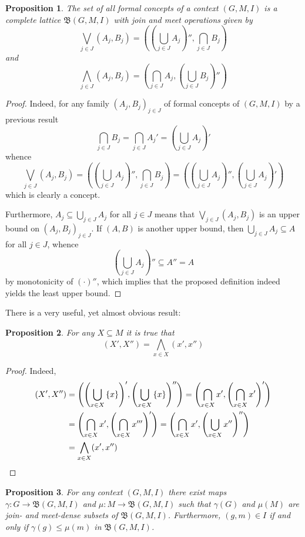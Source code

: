 \documentclass[a4paper]{article}
\newcommand{\obj}[1]{{\left\{ #1 \right \}}}
\newcommand{\brac}[1]{{\left ( #1 \right )}}
\newcommand{\cltc}{\mathfrak{B}}
\newtheorem{prop}{Proposition}
\begin{document}
\begin{prop} The set of all formal concepts of a context $(G,M,I)$ is a complete lattice $\cltc(G,M,I)$ with join and meet operations given by \[\bigvee_{j\in J} (A_j,B_j) = \brac{ \brac{\bigcup_{j\in J} A_j}'', \bigcap_{j\in J} B_j}\] and \[\bigwedge_{j\in J} (A_j,B_j) = \brac{\bigcap_{j\in J} A_j, \brac{\bigcup_{j\in J} B_j}''}\]
\end{prop}

\begin{proof}
Indeed, for any family $\brac{A_j,B_j}_{j\in J}$ of formal concepts of $(G,M,I)$ by a previous result \[\bigcap_{j\in J} B_j = \bigcap_{j\in J} A_j' = \brac{\bigcup_{j\in J} A_j}'\] whence \[\bigvee_{j\in J} (A_j,B_j) = \brac{ \brac{\bigcup_{j\in J} A_j}'', \bigcap_{j\in J} B_j} = \brac{ \brac{\bigcup_{j\in J} A_j}'', \brac{\bigcup_{j\in J} A_j}'}\] which is clearly a concept.

Furthermore, $A_j\subseteq \bigcup_{j\in J} A_j$ for all $j\in J$ means that $\bigvee_{j\in J} (A_j,B_j)$ is an upper bound on $\brac{A_j,B_j}_{j\in J}$. If $(A,B)$ is another upper bound, then $\bigcup_{j\in J} A_j\subseteq A$ for all $j\in J$, whence \[\brac{\bigcup_{j\in J} A_j}'' \subseteq A'' = A\] by monotonicity of ${(\cdot)}''$, which implies that the proposed definition indeed yields the least upper bound.
\end{proof}

There is a very useful, yet almost obvious result: \begin{prop} For any $X\subseteq M$ it is true that \[(X',X'') = \bigwedge_{x\in X} (x',x'')\]
\end{prop}

\begin{proof}
Indeed, 
\begin{align*}
	(X',X'') &= \brac{\brac{ \bigcup_{x\in X} \obj{x} }',\brac{ \bigcup_{x\in X} \obj{x} }''} = \brac{\bigcap_{x\in X} x', \brac{\bigcap_{x\in X} x'}'} \\
	& = \brac{\bigcap_{x\in X} x', \brac{\bigcap_{x\in X} x'''}'} = \brac{\bigcap_{x\in X} x', \brac{\bigcup_{x\in X} x''}''} \\ &= \bigwedge_{x\in X} (x', x'') \qedhere
\end{align*}
\end{proof}

\begin{prop} For any context $(G,M,I)$ there exist maps $\gamma:G\to\cltc(G,M,I)$ and $\mu:M\to\cltc(G,M,I)$ such that $\gamma(G)$ and $\mu(M)$ are join- and meet-dense subsets of $\cltc(G,M,I)$. Furthermore, $(g,m)\in I$ if and only if $\gamma(g)\leq \mu(m)$ in $\cltc(G,M,I)$.
\end{prop}
\end{document}
